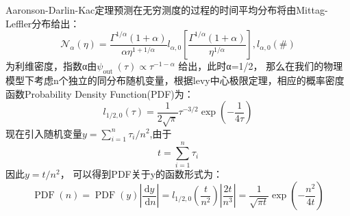 Aaronson-Darlin-Kac定理预测在无穷测度的过程的时间平均分布将由Mittag-Leffler分布给出：
\begin{equation}
\mathscr{N}_{\alpha}(\eta)=\frac{\Gamma^{1 / \alpha}(1+\alpha)}{\alpha \eta^{1+1 / \alpha}} l_{\alpha, 0}\left[\frac{\Gamma^{1 / \alpha}(1+\alpha)}{\eta^{1 / \alpha}}\right], l_{\alpha, 0}(\#)
\end{equation}
为利维密度，指数α由$\psi_{\text {out }}(\tau) \propto \tau^{-1-\alpha}$ 给出，此时α=1/2，
那么在我们的物理模型下考虑n个独立的同分布随机变量，根据levy中心极限定理\cite{metzlerRandomWalkGuide2000}，相应的概率密度函数Probability Density Function(PDF)为：\begin{equation}
l_{1 / 2,0}(\tau)=\frac{1}{2 \sqrt{\pi}} \tau^{-3 / 2} \exp \left(-\frac{1}{4 \tau}\right)
\end{equation}
现在引入随机变量$y=\sum_{i=1}^{n} \tau_{i} / n^{2}$,由于
\begin{equation}
t=\sum_{i=1}^{n} \tau_{i}
\end{equation}
因此$y=t / n^{2}$，
可以得到PDF关于y的函数形式为：
\begin{equation}
\operatorname{PDF}(n)=\operatorname{PDF}(y)\left|\frac{\mathrm{d} y}{\mathrm{~d} n}\right|=
l_{1 / 2,0}\left(\frac{t}{n^{2}}\right)\left|\frac{2 t}{n^{3}}\right|=\frac{1}{\sqrt{\pi t}} \exp \left(-\frac{n^{2}}{4 t}\right)
\end{equation}